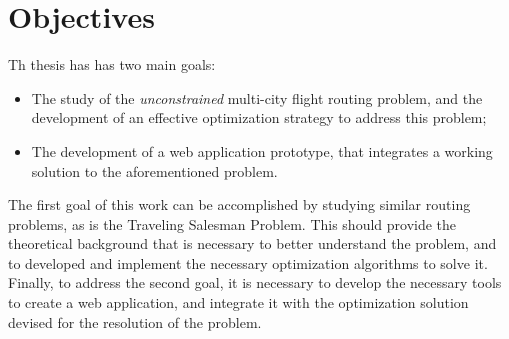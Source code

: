 \section{Objectives}

Th thesis has has two main goals:
\begin{itemize}
    \item The study of the \textit{unconstrained} multi-city flight routing problem, and the development of an effective optimization strategy to address this problem;
    \item The development of a web application prototype, that integrates a working solution to the aforementioned problem.
\end{itemize}

The first goal of this work can be accomplished by studying similar routing problems, as is the Traveling Salesman Problem. This should provide the theoretical background that is necessary to better understand the problem, and to developed and implement the necessary optimization algorithms to solve it. Finally, to address the second goal, it is necessary to develop the necessary tools to create a web application, and integrate it with the optimization solution devised for the resolution of the problem.





















